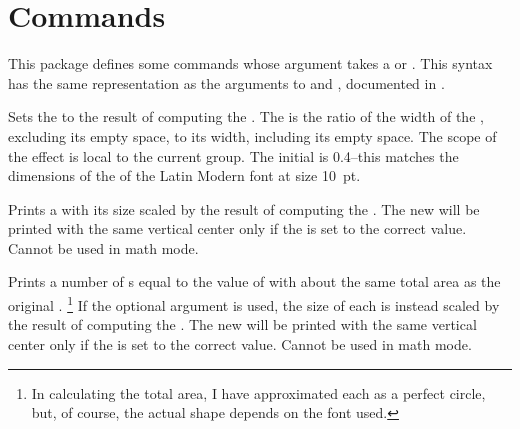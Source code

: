 \documentclass{beery}
\begin{document}
\section{Commands}
\label{sec:commands}

This package defines some commands whose argument takes a  or .
This syntax has the same representation as the arguments to  and , documented in .

\begin{mydisplaycode}
   
\end{mydisplaycode}

Sets the \textbulletfactor{} to the result of computing the .
The \textbulletfactor{} is the ratio of the width of the , excluding its empty space, to its width, including its empty space.
The scope of the effect is local to the current group.
The initial \textbulletfactor{} is \num{0.4}\---this matches the dimensions of the  of the Latin Modern font at size \qty{10}{pt}.
\pagebreak%

\begin{mydisplaycode}
   
\end{mydisplaycode}

Prints a  with its size scaled by the result of computing the .
The new  will be printed with the same vertical center only if the \textbulletfactor{} is set to the correct value.
Cannot be used in math mode.

\begin{mydisplaycode}
    
\end{mydisplaycode}

Prints a number of s equal to the value of  with about the same total area as the original .%
\footnote
  {%
    In calculating the total area, I have approximated each  as a perfect circle, but, of course, the actual shape depends on the font used.%
  }
If the optional argument is used, the size of each  is instead scaled by the result of computing the .
The new  will be printed with the same vertical center only if the \textbulletfactor{} is set to the correct value.
Cannot be used in math mode.
\end{document}
